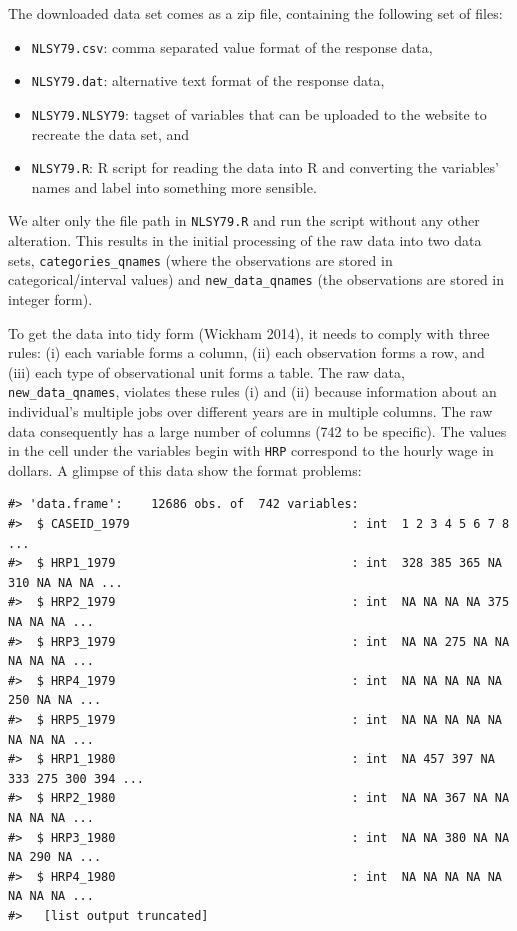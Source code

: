 \documentclass[12pt]{article}
\providecommand{\tightlist}{%
  \setlength{\itemsep}{0pt}\setlength{\parskip}{0pt}}
\begin{document}
The downloaded data set comes as a zip file, containing the following set of files:

\begin{itemize}
\tightlist
\item
  \texttt{NLSY79.csv}: comma separated value format of the response data,
\item
  \texttt{NLSY79.dat}: alternative text format of the response data,
\item
  \texttt{NLSY79.NLSY79}: tagset of variables that can be uploaded to the website to recreate the data set, and
\item
  \texttt{NLSY79.R}: R script for reading the data into R and converting the variables' names and label into something more sensible.
\end{itemize}

We alter only the file path in \texttt{NLSY79.R} and run the script without any other alteration. This results in the initial processing of the raw data into two data sets, \texttt{categories\_qnames} (where the observations are stored in categorical/interval values) and \texttt{new\_data\_qnames} (the observations are stored in integer form).

To get the data into tidy form (Wickham 2014), it needs to comply with three rules: (i) each variable forms a column, (ii) each observation forms a row, and (iii) each type of observational unit forms a table. The raw data, \texttt{new\_data\_qnames}, violates these rules (i) and (ii) because information about an individual's multiple jobs over different years are in multiple columns. The raw data consequently has a large number of columns (742 to be specific). The values in the cell under the variables begin with \texttt{HRP} correspond to the hourly wage in dollars. A glimpse of this data show the format problems:

\begin{verbatim}
#> 'data.frame':    12686 obs. of  742 variables:
#>  $ CASEID_1979                               : int  1 2 3 4 5 6 7 8 ...
#>  $ HRP1_1979                                 : int  328 385 365 NA 310 NA NA NA ...
#>  $ HRP2_1979                                 : int  NA NA NA NA 375 NA NA NA ...
#>  $ HRP3_1979                                 : int  NA NA 275 NA NA NA NA NA ...
#>  $ HRP4_1979                                 : int  NA NA NA NA NA 250 NA NA ...
#>  $ HRP5_1979                                 : int  NA NA NA NA NA NA NA NA ...
#>  $ HRP1_1980                                 : int  NA 457 397 NA 333 275 300 394 ...
#>  $ HRP2_1980                                 : int  NA NA 367 NA NA NA NA NA ...
#>  $ HRP3_1980                                 : int  NA NA 380 NA NA NA 290 NA ...
#>  $ HRP4_1980                                 : int  NA NA NA NA NA NA NA NA ...
#>   [list output truncated]
\end{verbatim}
\end{document}
